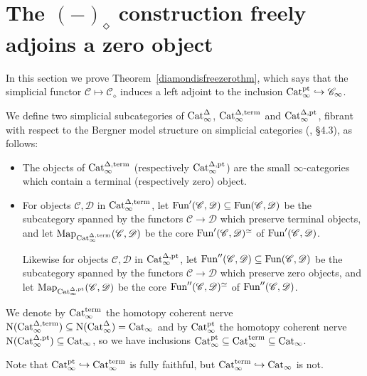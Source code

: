 \documentclass{tac}
\newcommand{\s}[1]{\mathscr{#1}}
\newcommand{\maybehat}[1]{#1} %
\newcommand{\tx}[1]{\textnormal{#1}}
\begin{document}
\section{The $(-)_\diamond$ construction freely adjoins a zero object}
In this section we prove Theorem~\ref{diamondisfreezerothm}, which says that the simplicial functor $\s{C} \mapsto \s{C}_\diamond$ induces a left adjoint to the inclusion $\tx{Cat}_\infty^\tx{pt} \hookrightarrow \s{C}_\infty$.
\begin{definition}\label{catinftyptdefn} We define two simplicial subcategories of $\tx{Cat}_\infty^\Delta$, $\tx{Cat}_{\infty}^{\Delta, \tx{term}}$ and $\tx{Cat}_{\infty}^{\Delta, \tx{pt}}$, fibrant with respect to the Bergner model structure on simplicial categories (\cite{bergner}, \S 4.3), as follows:
\begin{itemize}
\item The objects of $\tx{Cat}_{\infty}^{\Delta, \tx{term}}$ (respectively $\tx{Cat}_{\infty}^{\Delta, \tx{pt}}$) are the small $\infty$-categories which contain a terminal (respectively zero) object.
\item For objects $\s{C}, \s{D}$ in $\tx{Cat}_{\infty}^{\Delta, \tx{term}}$, let $\tx{Fun}' (\s{C}, \s{D}) \subseteq \tx{Fun}(\s{C}, \s{D})$ be the subcategory spanned by the functors $\s{C} \to \s{D}$ which preserve terminal objects, and let $\tx{Map}_{\tx{Cat}_{\infty}^{\Delta, \tx{term}}} (\s{C}, \s{D})$ be the core $\tx{Fun}' (\s{C}, \s{D})^\simeq$ of $\tx{Fun}' (\s{C}, \s{D})$.  
  
  Likewise for objects $\s{C}, \s{D}$ in $\tx{Cat}_{\infty}^{\Delta, \tx{pt}}$, let $\tx{Fun}'' (\s{C}, \s{D}) \subseteq \tx{Fun}(\s{C}, \s{D})$ be the subcategory spanned by the functors $\s{C} \to \s{D}$ which preserve zero objects, and let $\tx{Map}_{\tx{Cat}_{\infty}^{\Delta, \tx{pt}}} (\s{C}, \s{D})$ be the core $\tx{Fun}'' (\s{C}, \s{D})^\simeq$ of $\tx{Fun}'' (\s{C}, \s{D})$.
\end{itemize}
We denote by $\maybehat{\tx{Cat}}_\infty^\tx{term}$ the homotopy coherent nerve $\tx{N}(\tx{Cat}_{\infty}^{\Delta, \tx{term}}) \subseteq \tx{N}(\tx{Cat}_{\infty}^{\Delta}) = \tx{Cat}_\infty$ and by  $\maybehat{\tx{Cat}}_\infty^\tx{pt}$ the homotopy coherent nerve $\tx{N}(\tx{Cat}_{\infty}^{\Delta, \tx{pt}}) \subseteq  \tx{Cat}_\infty$, so we have inclusions $\maybehat{\tx{Cat}}_\infty^\tx{pt}\subseteq \maybehat{\tx{Cat}}_\infty^\tx{term} \subseteq \maybehat{\tx{Cat}}_\infty$.  

Note that $\maybehat{\tx{Cat}}_\infty^\tx{pt}\hookrightarrow \maybehat{\tx{Cat}}_\infty^\tx{term}$ is fully faithful, but $\maybehat{\tx{Cat}}_\infty^\tx{term} \hookrightarrow \maybehat{\tx{Cat}}_\infty$ is not.
\end{definition}
\end{document}
